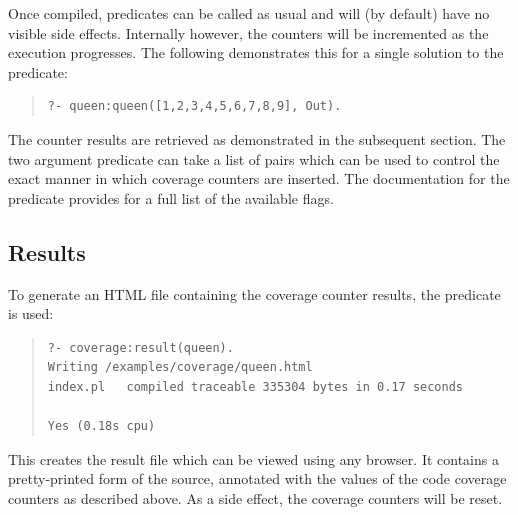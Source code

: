 Once compiled, predicates can be called as usual and will (by default)
have no visible side effects. Internally however, the counters will
be incremented as the execution progresses. The following demonstrates
this for a single solution to the  predicate:
\begin{quote}
\begin{verbatim}
?- queen:queen([1,2,3,4,5,6,7,8,9], Out).
\end{verbatim}
\end{quote}
The counter results are retrieved as demonstrated in the subsequent section.
The two argument predicate 
can take a list of  pairs
which can be used to control the exact manner in which coverage
counters are inserted. The documentation for the
 predicate
provides for a full list of the available flags.

\subsection{Results}

To generate an HTML file
containing the coverage counter results, the
predicate is used:
\begin{quote}
\begin{verbatim}
?- coverage:result(queen).
Writing /examples/coverage/queen.html
index.pl   compiled traceable 335304 bytes in 0.17 seconds

Yes (0.18s cpu)
\end{verbatim}
\end{quote}
This creates the result file  which
can be viewed using any browser.  It contains a pretty-printed form of
the source, annotated with the values of the code coverage counters as
described above. As a side effect, the coverage counters will be reset.

%

